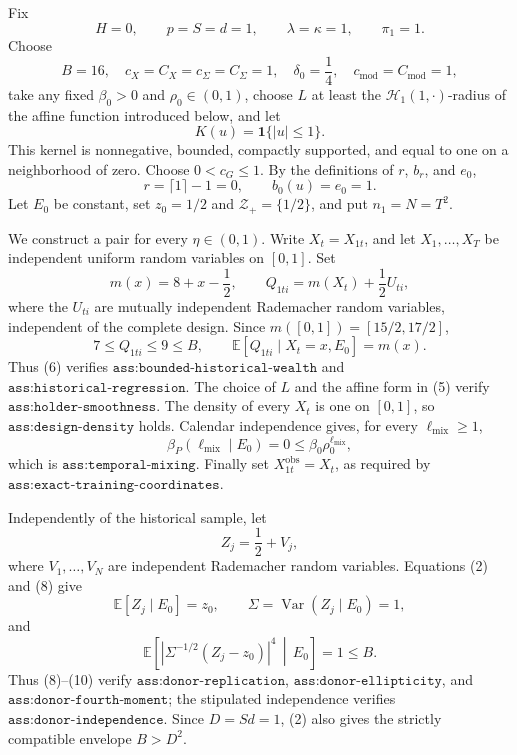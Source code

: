Fix
\[
H=0,
\qquad p=S=d=1,
\qquad \lambda=\kappa=1,
\qquad \pi_1=1.
\tag{1}
\]
Choose
\[
B=16,
\quad c_X=C_X=c_\Sigma=C_\Sigma=1,
\quad \delta_0=\frac14,
\quad c_{\mathrm{mod}}=C_{\mathrm{mod}}=1,
\tag{2}
\]
take any fixed \(\beta_0>0\) and \(\rho_0\in(0,1)\), choose \(L\) at least the \(\mathcal H_1(1,\cdot)\)-radius of the affine function introduced below, and let
\[
K(u)=\mathbf 1\{|u|\le 1\}.
\tag{3}
\]
This kernel is nonnegative, bounded, compactly supported, and equal to one on a neighborhood of zero.  Choose \(0<c_G\le 1\).  By the definitions of \(r\), \(b_r\), and \(e_0\),
\[
r=\lceil 1\rceil-1=0,
\qquad b_0(u)=e_0=1.
\tag{4}
\]
Let \(E_0\) be constant, set \(z_0=1/2\) and \(\mathcal Z_+=\{1/2\}\), and put \(n_1=N=T^2\).

We construct a pair for every \(\eta\in(0,1)\).  Write \(X_t=X_{1t}\), and let \(X_1,\ldots,X_T\) be independent uniform random variables on \([0,1]\).  Set
\[
m(x)=8+x-\frac12,
\qquad
Q_{1ti}=m(X_t)+\frac12U_{ti},
\tag{5}
\]
where the \(U_{ti}\) are mutually independent Rademacher random variables, independent of the complete design.  Since \(m([0,1])=[15/2,17/2]\),
\[
7\le Q_{1ti}\le 9\le B,
\qquad
\mathbb E[Q_{1ti}\mid X_t=x,E_0]=m(x).
\tag{6}
\]
Thus (6) verifies \(\texttt{ass:bounded-historical-wealth}\) and \(\texttt{ass:historical-regression}\).  The choice of \(L\) and the affine form in (5) verify \(\texttt{ass:holder-smoothness}\).  The density of every \(X_t\) is one on \([0,1]\), so \(\texttt{ass:design-density}\) holds.  Calendar independence gives, for every \(\ell_{\mathrm{mix}}\ge1\),
\[
\beta_P(\ell_{\mathrm{mix}}\mid E_0)=0
\le \beta_0\rho_0^{\ell_{\mathrm{mix}}},
\tag{7}
\]
which is \(\texttt{ass:temporal-mixing}\).  Finally set \(X_{1t}^{\mathrm{obs}}=X_t\), as required by \(\texttt{ass:exact-training-coordinates}\).

Independently of the historical sample, let
\[
Z_j=\frac12+V_j,
\tag{8}
\]
where \(V_1,\ldots,V_N\) are independent Rademacher random variables.  Equations (2) and (8) give
\[
\mathbb E[Z_j\mid E_0]=z_0,
\qquad
\Sigma=\operatorname{Var}(Z_j\mid E_0)=1,
\tag{9}
\]
and
\[
\mathbb E\!\left[
\left|\Sigma^{-1/2}(Z_j-z_0)\right|^4\,\middle|\,E_0
\right]=1\le B.
\tag{10}
\]
Thus (8)--(10) verify \(\texttt{ass:donor-replication}\), \(\texttt{ass:donor-ellipticity}\), and \(\texttt{ass:donor-fourth-moment}\); the stipulated independence verifies \(\texttt{ass:donor-independence}\).  Since \(D=Sd=1\), (2) also gives the strictly compatible envelope \(B>D^2\).


